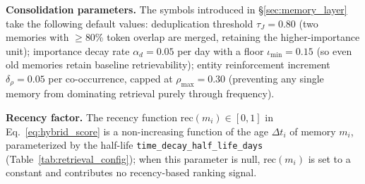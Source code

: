\noindent \textbf{Consolidation parameters.} The symbols introduced in \S\ref{sec:memory_layer} take the following default values: deduplication threshold $\tau_J{=}0.80$ (two memories with $\geq$80\% token overlap are merged, retaining the higher-importance unit); importance decay rate $\alpha_d{=}0.05$ per day with a floor $\iota_{\min}{=}0.15$ (so even old memories retain baseline retrievability); entity reinforcement increment $\delta_\rho{=}0.05$ per co-occurrence, capped at $\rho_{\max}{=}0.30$ (preventing any single memory from dominating retrieval purely through frequency).

\noindent \textbf{Recency factor.} The recency function $\text{rec}(m_i) \in [0, 1]$ in Eq.~\ref{eq:hybrid_score} is a non-increasing function of the age $\Delta t_i$ of memory $m_i$, parameterized by the half-life \texttt{time\_decay\_half\_life\_days} (Table~\ref{tab:retrieval_config}); when this parameter is null, $\text{rec}(m_i)$ is set to a constant and contributes no recency-based ranking signal.


\begin{table}[h]
\centering
\small
\caption{The \texttt{RetrievalConfig} dimensions exposed to the diagnosis LLM. Per-category overrides let the engine specialize different question types without forcing a single global choice.}
\label{tab:retrieval_config}
\vspace{0.5em}
\end{table}

